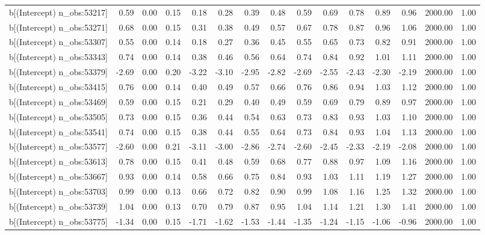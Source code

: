 \begin{table}[ht]
\begin{tabular}{rrrrrrrrrrrrrrr}
  b[(Intercept) n\_obs:53217] & 0.59 & 0.00 & 0.15 & 0.18 & 0.28 & 0.39 & 0.48 & 0.59 & 0.69 & 0.78 & 0.89 & 0.96 & 2000.00 & 1.00 \\ 
  b[(Intercept) n\_obs:53271] & 0.68 & 0.00 & 0.15 & 0.31 & 0.38 & 0.49 & 0.57 & 0.67 & 0.78 & 0.87 & 0.96 & 1.06 & 2000.00 & 1.00 \\ 
  b[(Intercept) n\_obs:53307] & 0.55 & 0.00 & 0.14 & 0.18 & 0.27 & 0.36 & 0.45 & 0.55 & 0.65 & 0.73 & 0.82 & 0.91 & 2000.00 & 1.00 \\ 
  b[(Intercept) n\_obs:53343] & 0.74 & 0.00 & 0.14 & 0.38 & 0.46 & 0.56 & 0.64 & 0.74 & 0.84 & 0.92 & 1.01 & 1.11 & 2000.00 & 1.00 \\ 
  b[(Intercept) n\_obs:53379] & -2.69 & 0.00 & 0.20 & -3.22 & -3.10 & -2.95 & -2.82 & -2.69 & -2.55 & -2.43 & -2.30 & -2.19 & 2000.00 & 1.00 \\ 
  b[(Intercept) n\_obs:53415] & 0.76 & 0.00 & 0.14 & 0.40 & 0.49 & 0.57 & 0.66 & 0.76 & 0.86 & 0.94 & 1.03 & 1.12 & 2000.00 & 1.00 \\ 
  b[(Intercept) n\_obs:53469] & 0.59 & 0.00 & 0.15 & 0.21 & 0.29 & 0.40 & 0.49 & 0.59 & 0.69 & 0.79 & 0.89 & 0.97 & 2000.00 & 1.00 \\ 
  b[(Intercept) n\_obs:53505] & 0.73 & 0.00 & 0.15 & 0.36 & 0.44 & 0.54 & 0.63 & 0.73 & 0.83 & 0.93 & 1.03 & 1.10 & 2000.00 & 1.00 \\ 
  b[(Intercept) n\_obs:53541] & 0.74 & 0.00 & 0.15 & 0.38 & 0.44 & 0.55 & 0.64 & 0.73 & 0.84 & 0.93 & 1.04 & 1.13 & 2000.00 & 1.00 \\ 
  b[(Intercept) n\_obs:53577] & -2.60 & 0.00 & 0.21 & -3.11 & -3.00 & -2.86 & -2.74 & -2.60 & -2.45 & -2.33 & -2.19 & -2.08 & 2000.00 & 1.00 \\ 
  b[(Intercept) n\_obs:53613] & 0.78 & 0.00 & 0.15 & 0.41 & 0.48 & 0.59 & 0.68 & 0.77 & 0.88 & 0.97 & 1.09 & 1.16 & 2000.00 & 1.00 \\ 
  b[(Intercept) n\_obs:53667] & 0.93 & 0.00 & 0.14 & 0.58 & 0.66 & 0.75 & 0.84 & 0.93 & 1.03 & 1.11 & 1.19 & 1.27 & 2000.00 & 1.00 \\ 
  b[(Intercept) n\_obs:53703] & 0.99 & 0.00 & 0.13 & 0.66 & 0.72 & 0.82 & 0.90 & 0.99 & 1.08 & 1.16 & 1.25 & 1.32 & 2000.00 & 1.00 \\ 
  b[(Intercept) n\_obs:53739] & 1.04 & 0.00 & 0.13 & 0.70 & 0.79 & 0.87 & 0.95 & 1.04 & 1.14 & 1.21 & 1.30 & 1.41 & 2000.00 & 1.00 \\ 
  b[(Intercept) n\_obs:53775] & -1.34 & 0.00 & 0.15 & -1.71 & -1.62 & -1.53 & -1.44 & -1.35 & -1.24 & -1.15 & -1.06 & -0.96 & 2000.00 & 1.00 \\ 

\end{tabular}
\end{table}
